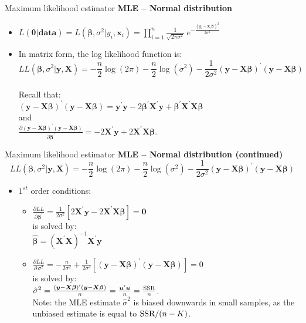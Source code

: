 \documentclass{beamer}
\begin{document}
\begin{frame}{Maximum likelihood estimator}
\textbf{MLE -- Normal distribution} \\ \bigskip
\begin{itemize}
    \item $L(\bm{\theta}|\textbf{data})=L(\bm{\beta},\sigma^2|y_i,\bm{x}_i)=
    \displaystyle\prod_{i=1}^n \frac{1}{\sqrt{2\pi\sigma^2}}~e^{-\frac{(y_i-\bm{x}_i\bm{\beta})^2}{2\sigma^2}}$
    \smallskip
    \item In matrix form, the log likelihood function is:
    \footnotesize{
    $$
    LL(\bm{\beta},\sigma^2|\bm{y},\bm{X})= - \frac{n}{2} \log(2\pi) - \frac{n}{2} \log(\sigma^2) - \frac{1}{2\sigma^2}(\bm{y}-\bm{X \beta})^{\prime}(\bm{y}-\bm{X \beta})
    $$\\
    } %
    \bigskip
    Recall that:\\ \medskip
    $(\bm{y}-\bm{X \beta})^{\prime}(\bm{y}-\bm{X \beta})=
    \bm{y}^{\prime}\bm{y} - 2\bm{\beta}^{\prime}\bm{X}^{\prime}\bm{y}+\bm{\beta}^{\prime}\bm{X}^{\prime}\bm{X \beta}$\\ \smallskip
    and \\ \medskip
    $\frac{\partial (\bm{y}-\bm{X \beta})^{\prime}(\bm{y}-\bm{X \beta})}{\partial \bm{\beta}^{\prime}} = -2\bm{X}^{\prime}\bm{y}+2\bm{X}^{\prime}\bm{X \beta}$.
\end{itemize}
\end{frame}
\begin{frame}{Maximum likelihood estimator}
\textbf{MLE -- Normal distribution (continued)} 
    $$
    LL(\bm{\beta},\sigma^2|\bm{y},\bm{X})= - \frac{n}{2} \log(2\pi) - \frac{n}{2} \log(\sigma^2) - \frac{1}{2\sigma^2}(\bm{y}-\bm{X \beta})^{\prime}(\bm{y}-\bm{X \beta})
    $$
\begin{itemize}
    \item $1^{st}$ order conditions:\\
    \medskip
    \begin{itemize}
        \item  $\frac{\partial LL}{\partial \bm{\beta}^{\prime}}=
    \frac{1}{2\sigma^2}[2\bm{X}^{\prime}\bm{y}-2\bm{X}^{\prime}\bm{X \beta}]=\bm{0}$\\ \medskip is solved by:\\ \medskip
    $\hat{\bm{\beta}} =(\bm{X}^{\prime}\bm{X})^{-1} \bm{X}^{\prime}\bm{y}$
    \bigskip
    \item $\frac{\partial LL}{\partial \, \sigma^2}=
    - \frac{n}{2\sigma^2}+\frac{1}{2\sigma^4}
    \left[ (\bm{y}-\bm{X \beta})^{\prime}(\bm{y}-\bm{X \beta}) \right] = 0$\\
    \medskip is solved by:\\ \medskip
    $\hat{\sigma}^2 = \frac{(\bm{y}-\bm{X \beta})^{\prime}(\bm{y}-\bm{X \beta})}{n} =  \frac{\bm{u}^{\prime}\bm{u}}{n} = \frac{\textnormal{SSR}}{n}$.\\ \medskip
    Note: the MLE estimate $\hat{\sigma}^2$ is biased downwards in small samples, as the unbiased estimate is equal to $\textnormal{SSR}/(n-K)$.
    \end{itemize}
\end{itemize}
\end{frame}
\end{document}
